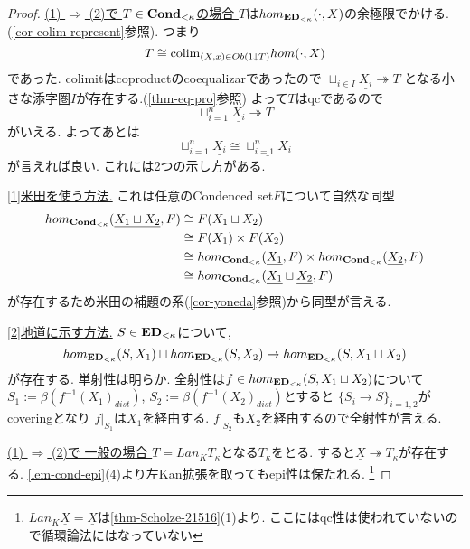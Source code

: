 \documentclass[dvipdfmx,a4paper,11pt]{article}
\newcommand{\colim}{{\rm colim}}
\theoremstyle{definition}
\begin{document}
 \begin{proof}

\underline{ (1) $\Rightarrow$ (2)で $T \in {\bf Cond}_{< \kappa}$の場合 }
$T$は$hom_{{\bf ED}_{<\kappa}}(\cdot, X)$の余極限でかける.
(\ref{cor-colim-represent}参照). つまり
 $$
 T \cong  \colim_{(X,x) \in Ob(1 \downarrow T)} hom(\cdot, X)
 $$
 であった.
 colimitはcoproductのcoequalizarであったので
 $\sqcup_{i \in I}\underline{X_i} \twoheadrightarrow T $
 となる小さな添字圏$I$が存在する.(\ref{thm-eq-pro}参照)
よって$T$はqcであるので
$$
\sqcup_{i=1}^{n}\underline{X_i} \twoheadrightarrow T 
$$ 
がいえる.
よってあとは
$$
\sqcup_{i=1}^{n}\underline{X_i}
\cong 
\underline{\sqcup_{i=1}^{n} X_i}
$$
が言えれば良い.
これには2つの示し方がある. 

\underline{[1]米田を使う方法.} これは任意のCondenced set$F$について自然な同型
\begin{align*}
\begin{split}
hom_{{\bf Cond}_{< \kappa}}(\underline{X_1 \sqcup X_2}, F)
& \cong  F(X_1 \sqcup X_2) \\
& \cong F(X_1) \times F(X_2) \\
& \cong hom_{{\bf Cond}_{< \kappa}} (\underline{X_1}, F)\times hom_{{\bf Cond}_{< \kappa}}(\underline{X_2}, F) \\
& \cong hom_{{\bf Cond}_{< \kappa}}(\underline{X_1}\sqcup \underline{X_2}, F) \\
\end{split}
\end{align*}
が存在するため米田の補題の系(\ref{cor-yoneda}参照)から同型が言える. 

\underline{[2]地道に示す方法.} $S \in {\bf ED}_{<\kappa}$について, 
$$
hom_{{\bf ED}_{< \kappa}}(S, X_1) \sqcup hom_{{\bf ED}_{< \kappa}}(S, X_2) \to  hom_{{\bf ED}_{< \kappa}}(S, X_1 \sqcup X_2)
$$
が存在する. 単射性は明らか. 
全射性は$f \in hom_{{\bf ED}_{< \kappa}}(S, X_1 \sqcup X_2)$について$S_1 := \beta(f^{-1}(X_1)_{dist})$, $S_2 := \beta(f^{-1}(X_2)_{dist})$とすると
$\{S_i \to S\}_{i=1,2}$がcoveringとなり
$f|_{S_{1}}$は$X_1$を経由する. $f|_{S_{2}}$も$X_2$を経由するので全射性が言える.

\underline{(1) $\Rightarrow$ (2)で 一般の場合 }
$T = Lan_{K}T_{\kappa}$となる$T_{\kappa}$をとる.
すると$\underline{X} \twoheadrightarrow T_{\kappa}$が存在する.
\ref{lem-cond-epi}(4)より左Kan拡張を取ってもepi性は保たれる. 
\footnote{$Lan_{K}\underline{X}=\underline{X}$は\ref{thm-Scholze-21516}(1)より. ここにはqc性は使われていないので循環論法にはなっていない}


\end{proof}
\end{document}
